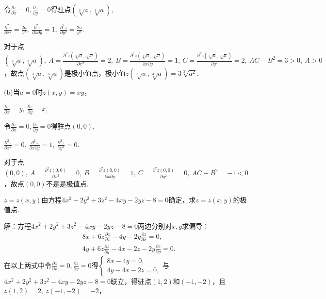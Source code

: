 \documentclass[12pt,UTF8]{ctexart}
\begin{document}
\begin{enumerate}
令$\frac{\partial z}{\partial x}=0,\frac{\partial z}{\partial y}=0$得驻点$(\sqrt[3]a,\sqrt[3]a)$,

$\frac{\partial^2z}{\partial x^2}=\frac{2a}{x^3},\ \frac{\partial^2z}{\partial x\partial y}=1,\ \frac{\partial^2z}{\partial y^2}=\frac{2a}{y^3}$.

对于点$(\sqrt[3]a,\sqrt[3]a),\ A=\frac{\partial^2z(\sqrt[3]a,\sqrt[3]a)}{\partial x^2}=2,\ B=\frac{\partial^2z(\sqrt[3]a,\sqrt[3]a)}{\partial x\partial y}=1,\ C=\frac{\partial^2z(\sqrt[3]a,\sqrt[3]a)}{\partial y^2}=2,\ AC-B^2=3>0,\ A>0$，故点$(\sqrt[3]a,\sqrt[3]a)$是极小值点，极小值$z(\sqrt[3]a,\sqrt[3]a)=3\sqrt[3]{a^2}$.

(b)当$a=0$时$z(x,y)=xy$，

$\frac{\partial z}{\partial x}=y,\ \frac{\partial z}{\partial y}=x$,

令$\frac{\partial z}{\partial x}=0,\frac{\partial z}{\partial y}=0$得驻点$(0,0)$,

$\frac{\partial^2z}{\partial x^2}=0,\ \frac{\partial^2z}{\partial x\partial y}=1,\ \frac{\partial^2z}{\partial y^2}=0$.

对于点$(0,0),\ A=\frac{\partial^2z(0,0)}{\partial x^2}=0,\ B=\frac{\partial^2z(0,0)}{\partial x\partial y}=1,\ C=\frac{\partial^2z(0,0)}{\partial y^2}=0,\ AC-B^2=-1<0$，故点$(0,0)$不是是极值点.

$z=z(x,y)$由方程$4x^2+2y^2+3z^2-4xy-2yz-8=0$确定，求$z=z(x,y)$的极值点.

解：方程$4x^2+2y^2+3z^2-4xy-2yz-8=0$两边分别对$x,y$求偏导：
\begin{subequations}
\begin{align}
&8x+6z\frac{\partial z}{\partial x}-4y-2y\frac{\partial z}{\partial x}=0,\label{2-1a}\\
&4y+6z\frac{\partial z}{\partial y}-4x-2z-2y\frac{\partial z}{\partial y}=0.\label{2-1b}
\end{align}
\end{subequations}
在以上两式中令$\frac{\partial z}{\partial x}=0,\frac{\partial z}{\partial y}=0$得$\begin{cases}
8x-4y=0,\\
4y-4x-2z=0,
\end{cases}$与$4x^2+2y^2+3z^2-4xy-2yz-8=0$联立，得驻点$(1,2)$和$(-1,-2)$，且$z(1,2)=2,\ z(-1,-2)=-2$，


\end{enumerate}
\end{document}
